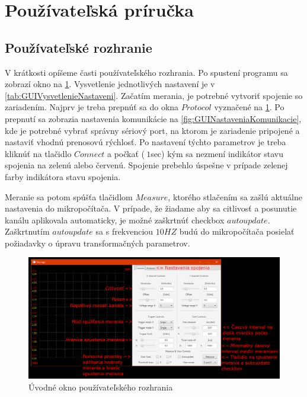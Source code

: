 \documentclass[main.tex]{subfiles}
\begin{document}
	\section{Používateľská príručka}
		\begin{multicols}{2}
			\subsection{Používateľské rozhranie}
			V krátkosti opíšeme časti používateľského rozhrania. Po spustení programu sa zobrazí okno na \cref{fig:GUIPrveOkno}. Vysvetlenie jednotlivých nastavení je v \cref{tab:GUIVysvetlenieNastaveni}. Začatím merania, je potrebné vytvoriť spojenie so zariadením. Najprv je treba prepnúť sa do okna $Protocol$ vyznačené na \cref{fig:GUIPrveOkno}. Po prepnutí sa zobrazia nastavenia komunikácie na \cref{fig:GUINastaveniaKomunikacie}, kde je potrebné vybrať správny sériový port, na ktorom je zariadenie pripojené a nastaviť vhodnú prenosovú rýchlosť. Po nastavení týchto parametrov je treba kliknúť na tlačidlo $Connect$ a počkať ($~1$sec) kým sa nezmení indikátor stavu spojenia na zelenú alebo červenú. Spojenie prebehlo úspešne v prípade zelenej farby indikátora stavu spojenia.
			
			Meranie sa potom spúšťa tlačidlom $Measure$, ktorého stlačením sa zašlú aktuálne nastavenia do mikropočítača. V prípade, že žiadame aby sa citlivosť a posunutie kanálu aplikovala automaticky, je možné zaškrtnúť checkbox $autoupdate$. Zaškrtnutím $autoupdate$ sa s frekvenciou $10HZ$ budú do mikropočítača posielať požiadavky o úpravu transformačných parametrov.  
			
			
		\end{multicols}
	
		\begin{figure}[h!]
			\centering
			\includegraphics[width=\linewidth]{../Obrazky/GUIPrveOkno}
			\caption{Úvodné okno používateľského rozhrania}
			\label{fig:GUIPrveOkno}
		\end{figure}
	
\end{document}

